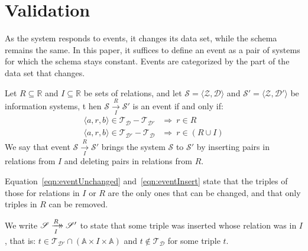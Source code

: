 \documentclass[runningheads]{llncs}
\newcommand{\xrightarrowdbl}[2][]{%
  \xrightarrow[#1]{#2}\mathrel{\mkern-14mu}\rightarrow
}
\newcommand{\pair}[2]{\langle{#1},{#2}\rangle}
\newcommand{\triple}[3]{\langle{#1},{#2},{#3}\rangle}
\newcommand{\Atoms}{\mathbb{A}}
\newcommand{\Rels}{\mathbb{R}}   %
\newcommand{\triples}{\mathcal{T}}
\newcommand{\Triple}[3]{#1\times#2\times#3}
\newcommand{\dataset}{\mathscr{D}}
\newcommand{\schema}{\mathscr{Z}}
\newcommand{\infsys}{\mathscr{S}}
\begin{document}
\section{Validation}
   As the system responds to events, it changes its data set, while the schema remains the same.
   In this paper, it suffices to define an event as a pair of systems for which the schema stays constant.
   Events are categorized by the part of the data set that changes.

\begin{definition}[Event]
   Let $R \subseteq \Rels$ and $I \subseteq \Rels$ be sets of relations,
   and let $\infsys=\pair{\schema}{\dataset}$ and  $\infsys'=\pair{\schema}{\dataset'}$ be information systems,
t  hen $\infsys\xrightarrow[I]{R} \infsys'$ is an event if and only if:
\begin{align}
   \triple{a}{r}{b}\in\triples_{\dataset}-\triples_{\dataset'}&\Rightarrow\ r\in R\label{eqn:eventUnchanged}\\
   \triple{a}{r}{b}\in\triples_{\dataset'}-\triples_{\dataset}&\Rightarrow\ r\in(R \cup I)\label{eqn:eventInsert}
\end{align}
   We say that event $\infsys\xrightarrow[I]{R} \infsys'$ brings the system $\infsys$ to $\infsys'$ by inserting pairs in relations from $I$ and deleting pairs in relations from $R$.
\end{definition}

   Equation~\ref{eqn:eventUnchanged} and~\ref{eqn:eventInsert} state that the triples of those for relations in $I$ or $R$ are the only ones that can be changed, and that only triples in $R$ can be removed.

\begin{definition}
   We write $\infsys \xrightarrowdbl[I]{R} \infsys'$ to state that some triple was inserted whose relation was in $I$, that is:
   $t \in \triples_{\dataset'} \cap (\Triple{\Atoms}{I}{\Atoms})$ and $t \not\in \triples_{\dataset}$ for some triple $t$.
\end{definition}
\end{document}
